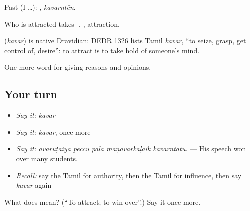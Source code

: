 Past (I …): , \emph{kavarntēṉ}.

Who is attracted takes -. , attraction.

\begin{cousinweb}
\textbf{} (\emph{kavar}) is native Dravidian: DEDR 1326 lists Tamil \emph{kavar}, \textquotedblleft{}to seize, grasp, get control of, desire\textquotedblright{}: to attract is to take hold of someone's mind.
\end{cousinweb}

\begin{grammarlens}[title={What you've built}]
One more word for giving reasons and opinions.
\end{grammarlens}

\subsection*{Your turn}
\begin{itemize}
\raggedright
  \item \emph{Say it:} \emph{kavar}
  \item \emph{Say it:} \emph{kavar}, once more
  \item \emph{Say it:} \emph{avaruṭaiya pēccu pala māṇavarkaḷaik kavarntatu.} — His speech won over many students.
  \item \emph{Recall:} say the Tamil for authority, then the Tamil for influence, then say \emph{kavar} again
\end{itemize}

\begin{tcolorbox}[breakable,colback=teal!4,colframe=teal!35!black,title={Before you move on}]
What does  mean? (\textquotedblleft{}To attract; to win over\textquotedblright{}.) Say it once more.
\end{tcolorbox}
